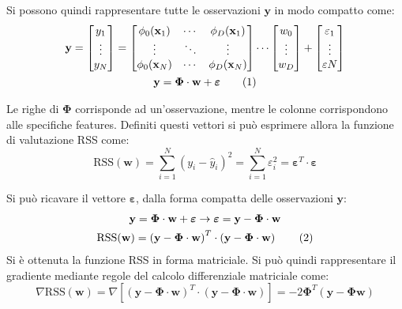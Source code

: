 \documentclass{article}
\numberwithin{equation}{subsection}
\newcommand{\tageq}{\tag{\stepcounter{equation}\theequation}}
\newcommand{\vect}[1]{\boldsymbol{\mathbf{#1}}}
\begin{document}
Si possono quindi rappresentare tutte le osservazioni $\vect{y}$ in modo compatto come:
\begin{gather*}
    \vect{y}=\begin{bmatrix}
        \strut y_1\\\vdots\\\strut y_N
    \end{bmatrix}=\begin{bmatrix}
        \phi_0(\vect{x}_1)&\cdots&\phi_D(\vect{x}_1)\\
        \vdots&\ddots&\vdots\\
        \phi_0(\vect{x}_N)&\cdots&\phi_D(\vect{x}_N)\\
    \end{bmatrix}\cdots\begin{bmatrix}
        \strut w_{0}\\\vdots\\\strut w_{D}
    \end{bmatrix}+\begin{bmatrix}
        \strut \varepsilon_{1}\\\vdots\\\strut \varepsilon{N}
    \end{bmatrix}\\
    \vect{y}=\vect{\Phi}\cdot\vect{w}+\vect{\varepsilon}\tageq
\end{gather*}

Le righe di $\vect{\Phi}$ corrisponde ad un'osservazione, mentre le colonne corrispondono 
alle specifiche features. 
Definiti questi vettori si può esprimere allora la funzione di valutazione RSS come:
\begin{equation}
    \text{RSS}(\vect{w})=\displaystyle\sum_{i=1}^N(y_i-\hat{y}_i)^2=\sum_{i=1}^N\varepsilon_i^2=\vect{\varepsilon}^T\cdot\vect{\varepsilon}
\end{equation}

Si può ricavare il vettore $\vect{\varepsilon}$, dalla forma compatta delle osservazioni $\vect{y}$:
\begin{gather*}
    \vect{y}=\vect{\Phi}\cdot\vect{w}+\vect{\varepsilon}\rightarrow\vect{\varepsilon}=\vect{y}-\vect{\Phi}\cdot\vect{w}\\
    \text{RSS}(\vect{w})=\left(\vect{y}-\vect{\Phi}\cdot\vect{w}\right)^T\cdot\left(\vect{y}-\vect{\Phi}\cdot\vect{w}\right)\tageq
\end{gather*}
Si è ottenuta la funzione RSS in forma matriciale. Si può quindi rappresentare il gradiente mediante regole del calcolo differenziale matriciale come:
\begin{equation}
    \nabla\text{RSS}(\vect{w})=\nabla\left[\left(\vect{y}-\vect{\Phi}\cdot\vect{w}\right)^T\cdot\left(\vect{y}-\vect{\Phi}\cdot\vect{w}\right)\right]=-2\vect{\Phi}^T(\vect{y}-\vect{\Phi}\vect{\vect{w}})
\end{equation}
\end{document}
